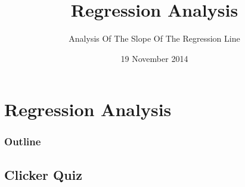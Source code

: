 
\section{Regression Analysis}

\title{Regression Analysis}
\subtitle{Analysis Of The Slope Of The Regression Line}

\date{19 November 2014}

\begin{frame}
  \titlepage
\end{frame}

\begin{frame}
  \frametitle{Outline}
  \tableofcontents[hideothersubsections,sectionstyle=show/hide]
\end{frame}


\subsection{Clicker Quiz}


